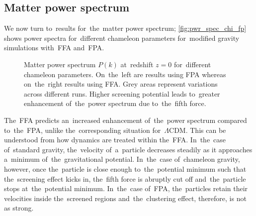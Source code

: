 \subsection{Matter power spectrum}
We now turn to~results for~the~matter power spectrum; \autoref{fig:pwr_spec_chi_fp} shows power spectra for~different chameleon parameters for~modified gravity simulations with~FFA and~FPA.
\begin{figure*}[bt]
	\begin{adjustwidth}{-1cm}{-1cm}
	\centering
		\begin{subfigure}{1.2\textwidth}
		\end{subfigure}
		\begin{subfigure}{0.5\textwidth}
		\end{subfigure}%
		\begin{subfigure}{0.5\textwidth}
		\end{subfigure}
		\begin{subfigure}{0.5\textwidth}
		\end{subfigure}%
		\begin{subfigure}{0.5\textwidth}
		\end{subfigure}
	\end{adjustwidth}
    \caption{Matter power spectrum $P(k)$ at~redshift $z=0$ for~different chameleon parameters. On~the~left are results using FPA whereas on~the~right results using FFA. Grey areas represent variations across different runs. Higher screening potential leads to~greater enhancement of~the~power spectrum due to~the~fifth force.}
    \label{fig:pwr_spec_chi_fp}
\end{figure*}

The~FFA predicts an~increased enhancement of~the~power spectrum compared to~the~FPA, unlike the~corresponding situation for~$\Lambda$CDM. This can be understood from how dynamics are treated within the~FFA. In~the~case of~standard gravity, the~velocity of~a~particle decreases steadily as it approaches a~minimum of~the~gravitational potential. In~the~case of~chameleon gravity, however, once the~particle is close enough to~the~potential minimum such that the~screening effect kicks in, the~fifth force is abruptly cut off and~the~particle stops at~the~potential minimum. In~the~case of~FPA, the~particles retain their velocities inside the~screened regions and~the~clustering effect, therefore, is not as strong.

